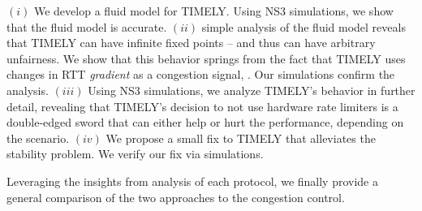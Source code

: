  $(i)$ We develop a fluid model for TIMELY. Using NS3 simulations,
we show that the fluid model is accurate. $(ii)$ simple analysis of the fluid model
reveals that TIMELY can have infinite fixed points -- and thus can have
arbitrary unfairness. We show that this behavior springs from the fact that
TIMELY uses changes in RTT \textit{gradient} as a congestion signal, .
Our simulations confirm the analysis. $(iii)$ Using NS3
simulations, we analyze TIMELY's behavior in further detail, revealing that
TIMELY's decision to not use hardware rate limiters is a double-edged sword that
can either help or hurt the performance, depending on the scenario. $(iv)$ We
propose a small fix to TIMELY that alleviates the stability problem. We verify
our fix via simulations.

Leveraging the insights from analysis of each protocol, we finally provide a
general comparison of the two approaches to the congestion control. 


